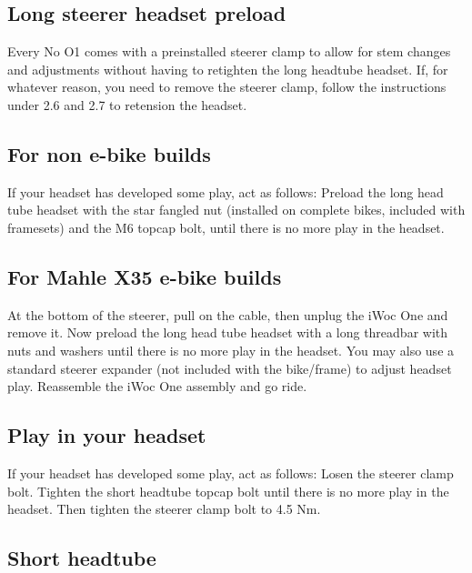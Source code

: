 \documentclass[12 pt]{article}
\newcommand{\bodyimage}[1]{\rightline{}}}
\begin{document}
\subsection{Long steerer headset preload}

Every No O1 comes with a preinstalled steerer clamp to allow for stem
changes and adjustments without having to retighten the long headtube
headset. If, for whatever reason, you need to remove the steerer
clamp, follow the instructions under 2.6 and 2.7 to retension the
headset.

\bodyimage{2_4_1_steerer_clamp.svg}

\subsection{For non e-bike builds}

If your headset has developed some play, act as follows: Preload the
long head tube headset with the star fangled nut (installed on
complete bikes, included with framesets) and the M6 topcap bolt, until
there is no more play in the headset.

\subsection{For Mahle X35 e-bike builds}

At the bottom of the steerer, pull on the cable, then unplug the iWoc
One and remove it. Now preload the long head tube headset with a long
threadbar with nuts and washers until there is no more play in the
headset. You may also use a standard steerer expander (not included
with the bike/frame) to adjust headset play. Reassemble the iWoc One
assembly and go ride.

\bodyimage{2_4_2_threadbar.svg}

\subsection{Play in your headset}

If your headset has developed some play, act as follows: Losen the
steerer clamp bolt. Tighten the short headtube topcap bolt until there
is no more play in the headset. Then tighten the steerer clamp bolt to
4.5 Nm.

\bodyimage{2_5_short_steerer_headset_preload.svg}

\subsection{Short headtube}
\end{document}
